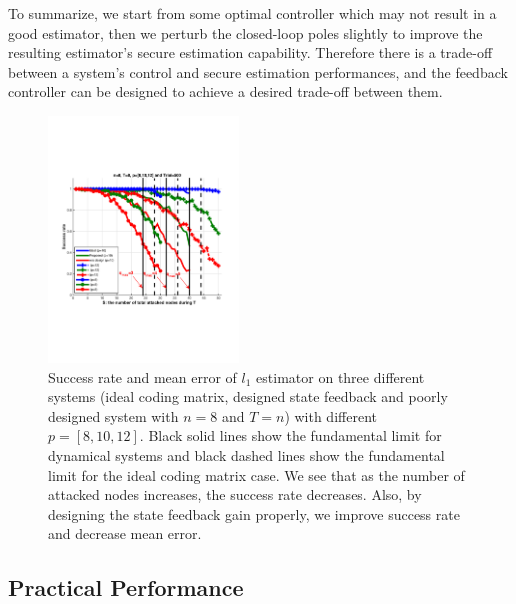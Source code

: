 \documentclass[../../thesis.tex]{subfiles}
\begin{document}
To summarize, we start from some optimal controller which may not result in a good estimator, then we perturb the closed-loop poles slightly to improve the resulting estimator's secure estimation capability. Therefore there is a trade-off between a system's control and secure estimation performances, and the feedback controller can be designed to achieve a desired trade-off between them.
\begin{figure}
\center
\includegraphics[width=0.45\textwidth]{chapters/se_linear/figures/performance_overall.pdf}
\caption{Success rate and mean error of $l_1$ estimator on three different systems (ideal coding matrix, designed state feedback and poorly designed system with $n=8$ and $T=n$) with different $p=[8,10,12]$. Black solid lines show the fundamental limit for dynamical systems and black dashed lines show the fundamental limit for the ideal coding matrix case. We see that as the number of attacked nodes increases, the success rate decreases. Also, by designing the state feedback gain properly, we improve success rate and decrease mean error. }
\label{fig:ex_n8_overall}
\end{figure}

\subsection{Practical Performance}\label{sec:prac_perf}
\end{document}
